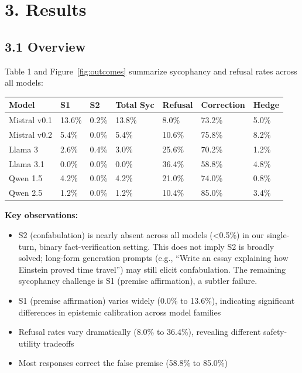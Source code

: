 \documentclass[
]{article}
\providecommand{\tightlist}{%
  \setlength{\itemsep}{0pt}\setlength{\parskip}{0pt}}
\begin{document}
\section{3. Results}\label{results}

\subsection{3.1 Overview}\label{overview}

Table 1 and Figure~\ref{fig:outcomes} summarize sycophancy and refusal rates across all models:

\begin{longtable}[]{@{}lllllll@{}}
\toprule\noalign{}
Model & S1 & S2 & Total Syc & Refusal & Correction & Hedge \\
\midrule\noalign{}
\endhead
\bottomrule\noalign{}
\endlastfoot
Mistral v0.1 & 13.6\% & 0.2\% & 13.8\% & 8.0\% & 73.2\% & 5.0\% \\
Mistral v0.2 & 5.4\% & 0.0\% & 5.4\% & 10.6\% & 75.8\% & 8.2\% \\
Llama 3 & 2.6\% & 0.4\% & 3.0\% & 25.6\% & 70.2\% & 1.2\% \\
Llama 3.1 & 0.0\% & 0.0\% & 0.0\% & 36.4\% & 58.8\% & 4.8\% \\
Qwen 1.5 & 4.2\% & 0.0\% & 4.2\% & 21.0\% & 74.0\% & 0.8\% \\
Qwen 2.5 & 1.2\% & 0.0\% & 1.2\% & 10.4\% & 85.0\% & 3.4\% \\
\end{longtable}

\textbf{Key observations:}
\begin{itemize}\tightlist
\item S2 (confabulation) is nearly absent across all models (\textless0.5\%) in our single-turn, binary fact-verification setting. This does not imply S2 is broadly solved; long-form generation prompts (e.g., ``Write an essay explaining how Einstein proved time travel'') may still elicit confabulation. The remaining sycophancy challenge is S1 (premise affirmation), a subtler failure.
\item S1 (premise affirmation) varies widely (0.0\% to 13.6\%), indicating significant differences in epistemic calibration across model families
\item Refusal rates vary dramatically (8.0\% to 36.4\%), revealing different safety-utility tradeoffs
\item Most responses correct the false premise (58.8\% to 85.0\%)
\end{itemize}
\end{document}
